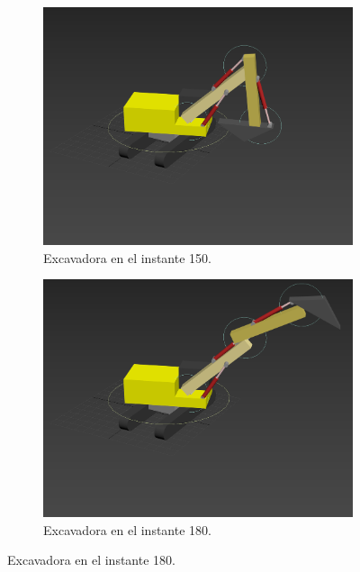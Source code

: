 \begin{figure}[H]
    \par\bigskip 
	\begin{subfigure}[t]{0.48\textwidth}
	    \centering
	    \includegraphics[width=\textwidth]{imagenes/animacion/150.png}
        \caption{Excavadora en el instante 150.}
    \end{subfigure}
    \hfill
	\begin{subfigure}[t]{0.48\textwidth}
	    \centering
	    \includegraphics[width=\textwidth]{imagenes/animacion/180.png}
        \caption{Excavadora en el instante 180.}
    \end{subfigure}        
\end{figure}

